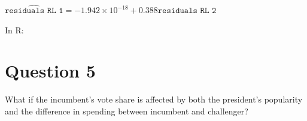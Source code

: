 \documentclass[12pt,letterpaper]{article}
\begin{document}
\begin{enumerate}
\begin{center}
				\vspace{.3cm}
				
				\(\widehat{\texttt{residuals RL 1}} = -1.942\times10^{-18} + 0.388\texttt{residuals RL 2}\)
			\end{center}
		\vspace{.25cm}
		
		In R:\\
		  
		
	\end{enumerate}
	
	\newpage	

\section*{Question 5}
\noindent What if the incumbent's vote share is affected by both the president's popularity and the difference in spending between incumbent and challenger? 
\end{document}
